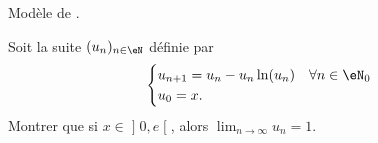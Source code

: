
\begin{exercice}\label{exoTD3-0013}

    Modèle de .

    Soit la suite $(u_n)_{n\in\eN}$ définie par
    \begin{equation}
        \begin{cases}
            u_{n+1}=u_n-u_n\ln(u_n) &   \text{$\forall n\in\eN_0$}\\
            u_0=x.
        \end{cases}
    \end{equation}
    Montrer que si $x\in\mathopen] 0 , e \mathclose[$, alors $\lim_{n\to\infty}u_n=1$.

\end{exercice}
